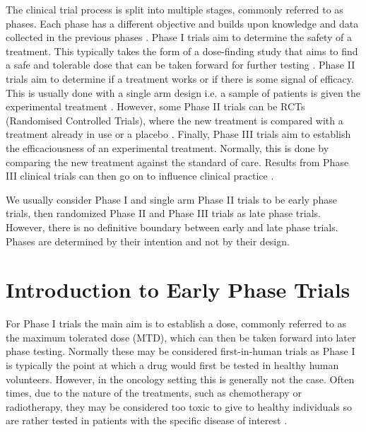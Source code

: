 The clinical trial process is split into multiple stages, commonly referred to as phases. Each phase has a different objective and builds upon knowledge and data collected in the previous phases \cite{wrightChapterClinicalTrial2017}. Phase I trials aim to determine the safety of a treatment. This typically takes the form of a dose-finding study that aims to find a safe and tolerable dose that can be taken forward for further testing \cite{iasonosRandomisedPhaseClinical2021}. Phase II trials aim to determine if a treatment works or if there is some signal of efficacy. This is usually done with a single arm design i.e. a sample of patients is given the experimental treatment \cite{esteyNewDesignsPhase2003}. However, some Phase II trials can be RCTs (Randomised Controlled Trials), where the new treatment is compared with a treatment already in use or a placebo \cite{mandrekarRandomizedPhaseII2010}. Finally, Phase III trials aim to establish the efficaciousness of an experimental treatment. Normally, this is done by comparing the new treatment against the standard of care. Results from Phase III clinical trials can then go on to 
influence clinical practice \cite{umscheidKeyConceptsClinical2011}.

We usually consider Phase I and single arm Phase II trials to be early phase trials, then randomized Phase II and Phase III trials as late phase trials. However, there is no definitive boundary between early and late phase trials. Phases are determined by their intention and not by their design.

\section{Introduction to Early Phase Trials}

For Phase \RN{1} trials the main aim is to establish a dose, commonly referred to as the maximum tolerated dose (MTD), which can then be taken forward into later phase testing. Normally these may be considered first-in-human trials as Phase \RN{1} is typically the point at which a drug would first be tested in healthy human volunteers. However, in the oncology setting this is generally not the case. Often times, due to the nature of the treatments, such as chemotherapy or radiotherapy, they may be considered too toxic to give to healthy individuals so are rather tested in patients with the specific disease of interest \cite{salzbergFirstinHumanPhaseStudies2012}. 

